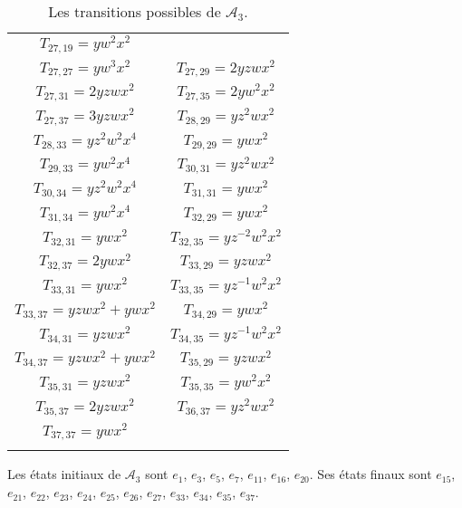 \begin{longtable}{|c|c|}
$T_{27,19}= yw^2x^2$\\

$T_{27,27}= yw^3x^2$&

$T_{27,29}= 2yzwx^2$\\

$T_{27,31}= 2yzwx^2$&

$T_{27,35}= 2yw^2x^2$\\

$T_{27,37}= 3yzwx^2$&

$T_{28,29}= yz^2wx^2$\\

$T_{28,33}= yz^2w^2x^4$&

$T_{29,29}= ywx^2$\\

$T_{29,33}= yw^2x^4$&

$T_{30,31}= yz^2wx^2$\\

$T_{30,34}= yz^2w^2x^4$&

$T_{31,31}= ywx^2$\\

$T_{31,34}= yw^2x^4$&

$T_{32,29}= ywx^2$\\

$T_{32,31}= ywx^2$&

$T_{32,35}= yz^{-2}w^2x^2$\\

$T_{32,37}= 2ywx^2$&

$T_{33,29}= yzwx^2$\\

$T_{33,31}= ywx^2$&

$T_{33,35}= yz^{-1}w^2x^2$\\

$T_{33,37}= yzwx^2+ywx^2$&

$T_{34,29}= ywx^2$\\

$T_{34,31}= yzwx^2$&

$T_{34,35}= yz^{-1}w^2x^2$\\

$T_{34,37}= yzwx^2+ywx^2$&

$T_{35,29}= yzwx^2$\\

$T_{35,31}= yzwx^2$&

$T_{35,35}= yw^2x^2$\\

$T_{35,37}= 2yzwx^2$&

$T_{36,37}= yz^2wx^2$\\

$T_{37,37}= ywx^2$& \\
\hline
\caption{\label{tab3} Les transitions possibles de $\mathcal{A}_{3}$.}
\end{longtable} 
\normalsize
Les états initiaux de $\mathcal{A}_{3}$ sont $e_{1}$, $e_{3}$, $e_{5}$, $e_{7}$, $e_{11}$, $e_{16}$,  $e_{20}$.  Ses états finaux  sont $e_{15}$, $e_{21}$, $e_{22}$, $e_{23}$, $e_{24}$, $e_{25}$,  $e_{26}$, $e_{27}$, $e_{33}$, $e_{34}$, $e_{35}$, $e_{37}$.       
